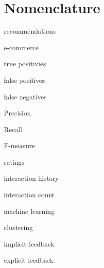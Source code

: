 \chapter{Nomenclature}\label{cha:nomenclature}

recommendations

e-commerce

true positivies

false positives

false negatives

Precision

Recall

F-measure

ratings

interaction history

interaction count

machine learning

clustering

implicit feedback

explicit feedback
